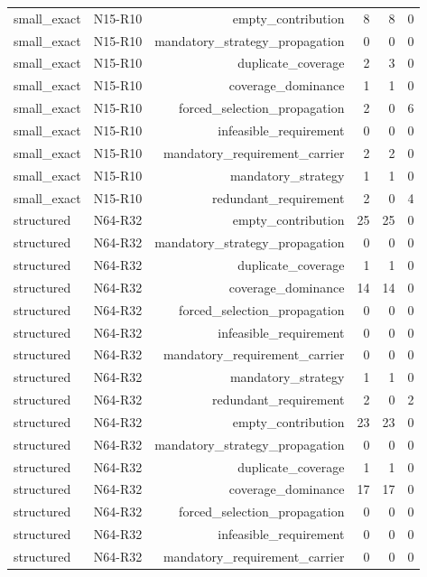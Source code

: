 {\begin{longtable}{lrrrrr}
small\_exact & N15-R10 & empty\_contribution & 8 & 8 & 0 \\
small\_exact & N15-R10 & mandatory\_strategy\_propagation & 0 & 0 & 0 \\
small\_exact & N15-R10 & duplicate\_coverage & 2 & 3 & 0 \\
small\_exact & N15-R10 & coverage\_dominance & 1 & 1 & 0 \\
small\_exact & N15-R10 & forced\_selection\_propagation & 2 & 0 & 6 \\
small\_exact & N15-R10 & infeasible\_requirement & 0 & 0 & 0 \\
small\_exact & N15-R10 & mandatory\_requirement\_carrier & 2 & 2 & 0 \\
small\_exact & N15-R10 & mandatory\_strategy & 1 & 1 & 0 \\
small\_exact & N15-R10 & redundant\_requirement & 2 & 0 & 4 \\
structured & N64-R32 & empty\_contribution & 25 & 25 & 0 \\
structured & N64-R32 & mandatory\_strategy\_propagation & 0 & 0 & 0 \\
structured & N64-R32 & duplicate\_coverage & 1 & 1 & 0 \\
structured & N64-R32 & coverage\_dominance & 14 & 14 & 0 \\
structured & N64-R32 & forced\_selection\_propagation & 0 & 0 & 0 \\
structured & N64-R32 & infeasible\_requirement & 0 & 0 & 0 \\
structured & N64-R32 & mandatory\_requirement\_carrier & 0 & 0 & 0 \\
structured & N64-R32 & mandatory\_strategy & 1 & 1 & 0 \\
structured & N64-R32 & redundant\_requirement & 2 & 0 & 2 \\
structured & N64-R32 & empty\_contribution & 23 & 23 & 0 \\
structured & N64-R32 & mandatory\_strategy\_propagation & 0 & 0 & 0 \\
structured & N64-R32 & duplicate\_coverage & 1 & 1 & 0 \\
structured & N64-R32 & coverage\_dominance & 17 & 17 & 0 \\
structured & N64-R32 & forced\_selection\_propagation & 0 & 0 & 0 \\
structured & N64-R32 & infeasible\_requirement & 0 & 0 & 0 \\
structured & N64-R32 & mandatory\_requirement\_carrier & 0 & 0 & 0 \\

\end{longtable}}
